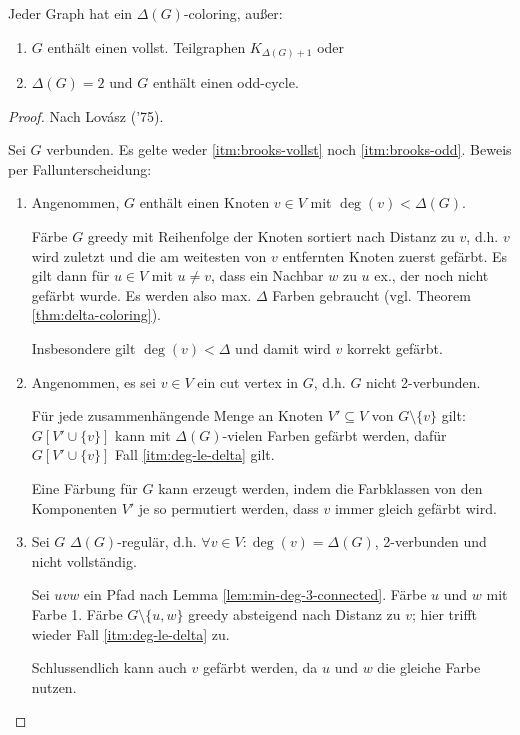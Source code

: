 \begin{theorem}
    Jeder Graph hat ein $ \Delta(G) $-coloring, außer:
    \begin{enumerate}
        \item \label{itm:brooks-vollst}
        $ G $ enthält einen vollst. Teilgraphen $ K_{\Delta(G) + 1} $ oder
        \item \label{itm:brooks-odd}
        $ \Delta(G) = 2 $ und $ G $ enthält einen odd-cycle.
    \end{enumerate}
\end{theorem}

\begin{proof}
    Nach Lov\'{a}sz ('75).

    Sei $ G $ verbunden.
    Es gelte weder \ref{itm:brooks-vollst} noch \ref{itm:brooks-odd}.
    Beweis per Fallunterscheidung:
    \begin{enumerate}
        \item \label{itm:deg-le-delta}
        Angenommen, $ G $  enthält einen Knoten $ v \in V $ mit $ \deg(v) < \Delta(G) $.

        Färbe $ G $ greedy mit Reihenfolge der Knoten sortiert nach Distanz zu $ v $, d.h. $ v $ wird zuletzt und die am weitesten von $ v $ entfernten Knoten zuerst gefärbt.
        Es gilt dann für $ u \in V $ mit $ u \ne v $, dass ein Nachbar $ w $ zu $ u $ ex., der noch nicht gefärbt wurde.
        Es werden also max. $ \Delta $ Farben gebraucht (vgl. Theorem \ref{thm:delta-coloring}).

        Insbesondere gilt $ \deg(v) < \Delta $ und damit wird $ v $ korrekt gefärbt.

        \item Angenommen, es sei $ v \in V $ ein cut vertex in $ G $, d.h. $ G $ nicht 2-verbunden.

        Für jede zusammenhängende Menge an Knoten $ V' \subseteq V $ von $ G \setminus \{ v \} $ gilt: $ G[V' \cup \{ v \}] $ kann mit $ \Delta(G) $-vielen Farben gefärbt werden, dafür $ G[V' \cup \{ v \}] $ Fall \ref{itm:deg-le-delta} gilt.

        Eine Färbung für $ G $ kann erzeugt werden, indem die Farbklassen von den Komponenten $ V' $ je so permutiert werden, dass $ v $ immer gleich gefärbt wird.

        \item Sei $ G $ $ \Delta(G) $-regulär, d.h. $ \forall v \in V: \deg(v) = \Delta(G) $, 2-verbunden und nicht vollständig.

        Sei $ uvw $ ein Pfad nach Lemma \ref{lem:min-deg-3-connected}.
        Färbe $ u $ und $ w $ mit Farbe 1.
        Färbe $ G \setminus \{ u , w \} $ greedy absteigend nach Distanz zu $ v $; hier trifft wieder Fall \ref{itm:deg-le-delta} zu.

        Schlussendlich kann auch $ v $ gefärbt werden, da $ u $ und $ w $ die gleiche Farbe nutzen.
    \end{enumerate}
\end{proof}

